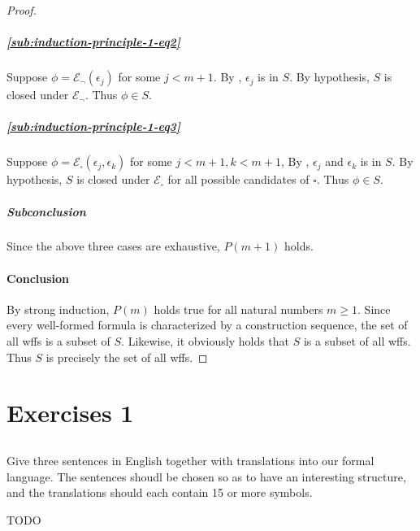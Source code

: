 \documentclass{report}
\begin{document}
\begin{proof}
      \subparagraph{\eqref{sub:induction-principle-1-eq2}}%

        Suppose $\phi = \mathcal{E}_\neg(\epsilon_j)$ for some $j < m + 1$.
        By , $\epsilon_j$ is in $S$.
        By hypothesis, $S$ is closed under $\mathcal{E}_\neg$.
        Thus $\phi \in S$.

      \subparagraph{\eqref{sub:induction-principle-1-eq3}}%

        Suppose $\phi = \mathcal{E}_\square(\epsilon_j, \epsilon_k)$ for some
          $j < m + 1, k < m + 1$,
        By , $\epsilon_j$ and $\epsilon_k$
          is in $S$.
        By hypothesis, $S$ is closed under $\mathcal{E}_\square$ for all
          possible candidates of $\square$.
        Thus $\phi \in S$.

      \subparagraph{Subconclusion}%

        Since the above three cases are exhaustive, $P(m + 1)$ holds.

    \paragraph{Conclusion}%

      By strong induction, $P(m)$ holds true for all natural numbers $m \geq 1$.
      Since every well-formed formula is characterized by a construction
        sequence, the set of all wffs is a subset of $S$.
      Likewise, it obviously holds that $S$ is a subset of all wffs.
      Thus $S$ is precisely the set of all wffs.

  \end{proof}

\section{Exercises 1}%

\subsection{}%

  Give three sentences in English together with translations into our formal
    language.
  The sentences shoudl be chosen so as to have an interesting structure, and the
    translations should each contain 15 or more symbols.

  \begin{answer}
    TODO
  \end{answer}
\end{document}
